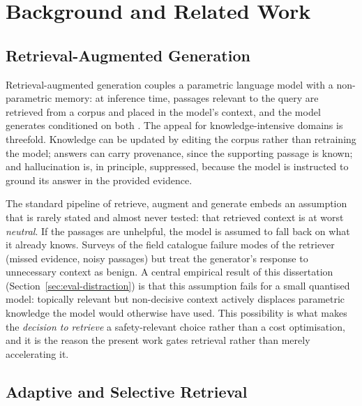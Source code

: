 \chapter{Background and Related Work}
\label{ch:background}

\section{Retrieval-Augmented Generation}
\label{sec:bg-rag}

Retrieval-augmented generation couples a parametric language model with a
non-parametric memory: at inference time, passages relevant to the query are
retrieved from a corpus and placed in the model's context, and the model
generates conditioned on both \citep{lewis2020rag}. The appeal for
knowledge-intensive domains is threefold. Knowledge can be updated by editing
the corpus rather than retraining the model; answers can carry provenance,
since the supporting passage is known; and hallucination is, in principle,
suppressed, because the model is instructed to ground its answer in the
provided evidence.

The standard pipeline of retrieve, augment and generate embeds an assumption
that is rarely stated and almost never tested: that retrieved context is at
worst \emph{neutral}. If the passages are unhelpful, the model is assumed to
fall back on what it already knows. Surveys of the field
\citep{gao2023ragsurvey} catalogue failure modes of the retriever (missed
evidence, noisy passages) but treat the generator's response to unnecessary
context as benign. A central empirical result of this dissertation
(Section~\ref{sec:eval-distraction}) is that this assumption fails for a
small quantised model: topically relevant but non-decisive context actively
displaces parametric knowledge the model would otherwise have used. This
possibility is what makes the \emph{decision to retrieve} a safety-relevant
choice rather than a cost optimisation, and it is the reason the present work
gates retrieval rather than merely accelerating it.

\section{Adaptive and Selective Retrieval}
\label{sec:bg-adaptive}

